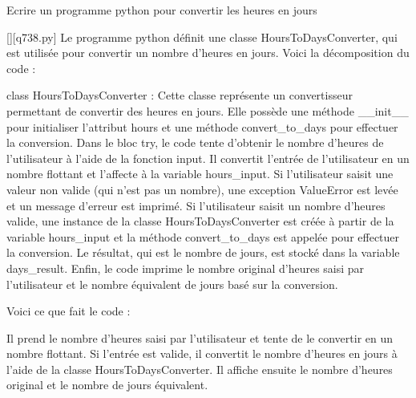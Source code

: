         \question
        Ecrire un programme python pour convertir les heures en jours
        \par
        \begin{solution}
            \renewcommand{\nomfichier}{q738.py}
            \pythonfile{\chemincode \nomfichier}[][\nomfichier]
            Le programme python définit une classe HoursToDaysConverter, qui est utilisée pour convertir un nombre d'heures en jours. Voici la décomposition du code :

    class HoursToDaysConverter : Cette classe représente un convertisseur permettant de convertir des heures en jours. Elle possède une méthode __init__ pour initialiser l'attribut hours et une méthode convert_to_days pour effectuer la conversion.
    Dans le bloc try, le code tente d'obtenir le nombre d'heures de l'utilisateur à l'aide de la fonction input. Il convertit l'entrée de l'utilisateur en un nombre flottant et l'affecte à la variable hours_input. Si l'utilisateur saisit une valeur non valide (qui n'est pas un nombre), une exception ValueError est levée et un message d'erreur est imprimé.
    Si l'utilisateur saisit un nombre d'heures valide, une instance de la classe HoursToDaysConverter est créée à partir de la variable hours_input et la méthode convert_to_days est appelée pour effectuer la conversion.
    Le résultat, qui est le nombre de jours, est stocké dans la variable days_result.
    Enfin, le code imprime le nombre original d'heures saisi par l'utilisateur et le nombre équivalent de jours basé sur la conversion.

Voici ce que fait le code :

    Il prend le nombre d'heures saisi par l'utilisateur et tente de le convertir en un nombre flottant.
    Si l'entrée est valide, il convertit le nombre d'heures en jours à l'aide de la classe HoursToDaysConverter.
    Il affiche ensuite le nombre d'heures original et le nombre de jours équivalent.
        \end{solution}
        

